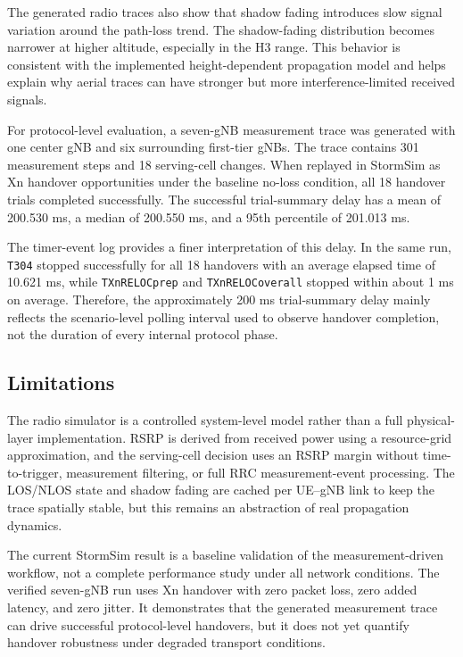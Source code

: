 The generated radio traces also show that shadow fading introduces slow signal variation around the path-loss trend. The shadow-fading distribution becomes narrower at higher altitude, especially in the H3 range. This behavior is consistent with the implemented height-dependent propagation model and helps explain why aerial traces can have stronger but more interference-limited received signals.

For protocol-level evaluation, a seven-gNB measurement trace was generated with one center gNB and six surrounding first-tier gNBs. The trace contains 301 measurement steps and 18 serving-cell changes. When replayed in StormSim as Xn handover opportunities under the baseline no-loss condition, all 18 handover trials completed successfully. The successful trial-summary delay has a mean of 200.530 ms, a median of 200.550 ms, and a 95th percentile of 201.013 ms.

The timer-event log provides a finer interpretation of this delay. In the same run, \texttt{T304} stopped successfully for all 18 handovers with an average elapsed time of 10.621 ms, while \texttt{TXnRELOCprep} and \texttt{TXnRELOCoverall} stopped within about 1 ms on average. Therefore, the approximately 200 ms trial-summary delay mainly reflects the scenario-level polling interval used to observe handover completion, not the duration of every internal protocol phase.

\subsection{Limitations}

The radio simulator is a controlled system-level model rather than a full physical-layer implementation. RSRP is derived from received power using a resource-grid approximation, and the serving-cell decision uses an RSRP margin without time-to-trigger, measurement filtering, or full RRC measurement-event processing. The LOS/NLOS state and shadow fading are cached per UE--gNB link to keep the trace spatially stable, but this remains an abstraction of real propagation dynamics.

The current StormSim result is a baseline validation of the measurement-driven workflow, not a complete performance study under all network conditions. The verified seven-gNB run uses Xn handover with zero packet loss, zero added latency, and zero jitter. It demonstrates that the generated measurement trace can drive successful protocol-level handovers, but it does not yet quantify handover robustness under degraded transport conditions.

